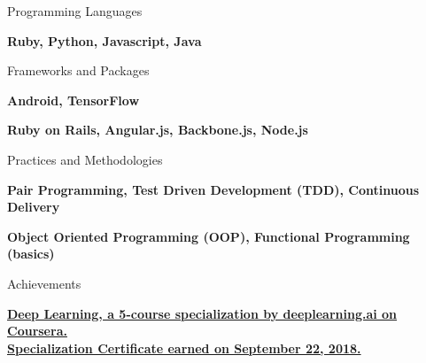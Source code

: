 \begin{cventries}
  \cventry
    {Programming Languages}
    {}
    {}
    {}
    {
      \begin{cvitems}
        \item {\textbf{Ruby, Python, Javascript, Java}}
      \end{cvitems}
    }
  \cventry
    {Frameworks and Packages}
    {}
    {}
    {}
    {
      \begin{cvitems}
        \item {\textbf{Android, TensorFlow}}
        \item {\textbf{Ruby on Rails, Angular.js, Backbone.js, Node.js}}
      \end{cvitems}
    }
  \cventry
    {Practices and Methodologies}
    {}
    {}
    {}
    {
      \begin{cvitems}
        \item {\textbf{Pair Programming, Test Driven Development (TDD), Continuous Delivery}}
        \item {\textbf{Object Oriented Programming (OOP), Functional Programming (basics)}}
      \end{cvitems}
    }
  \cventry
    {Achievements}
    {}
    {}
    {}
    {
      \begin{cvitems}
        \item {\href{https://www.coursera.org/account/accomplishments/specialization/7HYKL994GYY6}{\textbf{Deep Learning, a 5-course specialization by deeplearning.ai on Coursera.\\Specialization Certificate earned on September 22, 2018.}}}
      \end{cvitems}
    }
\end{cventries}

